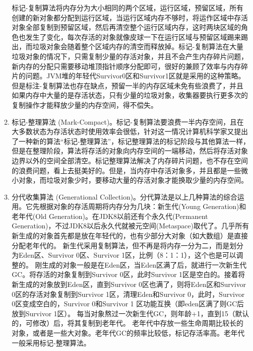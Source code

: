 \documentclass[../../../interview-questions.tex]{subfiles}
\begin{document}
\begin{enumerate}
    标记-复制算法将内存分为大小相同的两个区域，运行区域，预留区域，所有创建的新对象都分配到运行区域，当运行区域内存不够时，将运作区域中存活对象全部复制到预留区域，然后再清空整个运行区域内存，这时两块区域的角色也发生了变化，每次存活的对象就像皮球一下在运行区域与预留区域踢来踢出，而垃圾对象会随着整个区域内存的清空而释放掉。标记-复制算法在大量垃圾对象的情况下，只需复制少量的存活对象，并且不会产生内存碎片问题，新内存的分配只需要移动堆顶指针顺序分配即可，很好的兼顾了效率与内存碎片的问题。JVM堆的年轻代Survivor0区和Survivor1区就是采用的这种策略。但是标注-复制算法也存在缺点，预留一半的内存区域未免有些浪费了，并且如果内存中大量的是存活状态，只有少量的垃圾对象，收集器要执行更多次的复制操作才能释放少量的内存空间，得不偿失。
    \item{标记-整理算法 (Mark-Compact)。}标记-复制算法要浪费一半内存空间，且在大多数状态为存活状态时使用效率会很低，针对这一情况计算机科学家又提出了一种新的算法“标记-整理算法”，标记整理算法的标记阶段与其他算法一样，但是在整理阶段，算法将存活的对象向内存空间的一端移动，然后将存活对象边界以外的空间全部清空。标记整理算法解决了内存碎片问题，也不存在空间的浪费问题，看上去挺美好的。但是，当内存中存活对象多，并且都是一些微小对象，而垃圾对象少时，要移动大量的存活对象才能换取少量的内存空间。
    \item{分代收集算法 (Generational Collection)。}分代算法是以上几种算法的综合运用。它先根据对象的存活周期将内存分为几块：新生代(Young Generation)和老年代(Old Generation)。在JDK8以前还有个永久代(Permanent Generation)，不过JDK8以后永久代就被元空间(Metaspace)取代了。几乎所有新生成的对象首先都是放在年轻代的，也有少部分大对象（如大数组）是直接分配老年代的。
    新生代采用复制算法，但不再是将内存一分为二，而是划分为Eden区、Survivor 0区、Survivor 1区，比例（8：1：1），这个也是可以调整的。
    刚生成的对象一般是在Eden区，当Eden区满了后，就进行一次新生代GC。将存活的对象复制到Survivor 0区，此时Survivor 1区是空白的。接着将新生成的对象放到Eden区，直到Survivor 0区也满了，则将Eden区和Survivor 0区的存活对象复制到Survivor 1区，清理Eden和Survivor 0，此时，Survivor 0区变成空白的，Survivor 0和Survivor 1 区功能互换（即eden区满了则GC后放到Survivor 1区）。
    每当对象熬过一次新生代GC，则年龄+1，直到15（默认的，可修改）后，将其复制到老年代。
    老年代中存放一些生命周期比较长的对象，或者是一些大对象。老年代GC的频率比较低，标记存活率高。老年代一般采用标记-整理算法。
\end{enumerate}
\end{document}
